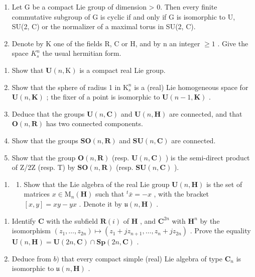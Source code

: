 
\begin{enumerate}
\def\labelenumi{\arabic{enumi})}
\item
  Let G be a compact Lie group of dimension \textgreater{} 0. Then every finite commutative subgroup of G is cyclic if and only if G is isomorphic to U, SU(2, C) or the normalizer of a maximal torus in SU(2, C).
\item
  Denote by K one of the fields R, C or H, and by n an integer \(\geq 1\) . Give the space \(K_{s}^{n}\) the usual hermitian form.
\end{enumerate}

\begin{enumerate}
\def\labelenumi{\alph{enumi})}
\item
  Show that \(\mathbf{U}(n,\mathrm{K})\) is a compact real Lie group.
\item
  Show that the sphere of radius 1 in \(\mathrm{K}_s^n\) is a (real) Lie homogeneous space for \(\mathbf{U}(n,\mathbf{K})\) ; the fixer of a point is isomorphic to \(\mathbf{U}(n - 1,\mathbf{K})\) .
\item
  Deduce that the groups \(\mathbf{U}(n,\mathbf{C})\) and \(\mathbf{U}(n,\mathbf{H})\) are connected, and that \(\mathbf{O}(n,\mathbf{R})\) has two connected components.
\item
  Show that the groups \(\mathbf{SO}(n,\mathbf{R})\) and \(\mathbf{SU}(n,\mathbf{C})\) are connected.
\item
  Show that the group \(\mathbf{O}(n,\mathbf{R})\) (resp. \(\mathbf{U}(n,\mathbf{C})\) ) is the semi-direct product of Z/2Z (resp. T) by \(\mathbf{SO}(n,\mathbf{R})\) (resp. \(\mathbf{SU}(n,\mathbf{C})\) ).
\end{enumerate}

\begin{enumerate}
\def\labelenumi{\arabic{enumi})}
\setcounter{enumi}{2}
\tightlist
\item
  \begin{enumerate}
  \def\labelenumii{\alph{enumii})}
  \tightlist
  \item
    Show that the Lie algebra of the real Lie group \(\mathbf{U}(n, \mathbf{H})\) is the set of matrices \(x \in \mathrm{M}_n(\mathbf{H})\) such that \(^t\bar{x} = -x\) , with the bracket \([x, y] = xy - yx\) . Denote it by \(\mathfrak{u}(n, \mathbf{H})\) .
  \end{enumerate}
\end{enumerate}

\begin{enumerate}
\def\labelenumi{\alph{enumi})}
\setcounter{enumi}{1}
\item
  Identify \(\mathbf{C}\) with the subfield \(\mathbf{R}(i)\) of \(\mathbf{H}\) , and \(\mathbf{C}^{2n}\) with \(\mathbf{H}^n\) by the isomorphism \((z_1, \ldots, z_{2n}) \mapsto (z_1 + jz_{n+1}, \ldots, z_n + jz_{2n})\) . Prove the equality \(\mathbf{U}(n, \mathbf{H}) = \mathbf{U}(2n, \mathbf{C}) \cap \mathbf{Sp}(2n, \mathbf{C})\) .
\item
  Deduce from \(b)\) that every compact simple (real) Lie algebra of type \(\mathbf{C}_n\) is isomorphic to \(\mathfrak{u}(n, \mathbf{H})\) .
\end{enumerate}

